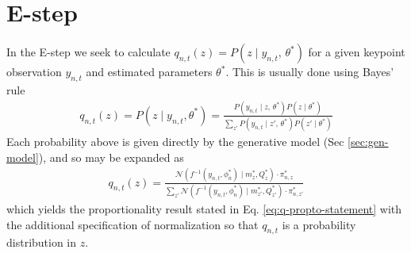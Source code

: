 \documentclass{article}         %
\newcommand{\NN}{\mathcal{N}}
\begin{document}
\section{E-step}

In the E-step we seek to calculate $q_{n, t}(z) = P(z\mid y_{n, t},\,\theta^*)$ for a given keypoint observation $y_{n, t}$ and estimated parameters $\theta^*$. This is usually done using Bayes' rule
\begin{align}
    q_{n,t}(z) = P(z\mid y_{n, t}, \theta^*) = \frac{P(y_{n, t}\mid z,\,\theta^*)P(z\mid \theta^*)}{\sum_{z'} P(y_{n, t}\mid z',\,\theta^*)P(z'\mid \theta^*)}
\end{align}
Each probability above is given directly by the generative model (Sec \ref{sec:gen-model}), and so may be expanded as
\begin{align}
    q_{n,t}(z) = \frac{ \NN(f^{-1}(y_{n,t}, \phi^*_n) \mid m_{z}^*, Q_{z}^*) \cdot \pi_{n,z}^* }{ \sum_{z'} \NN(f^{-1}(y_{n,t}, \phi^*_n) \mid m_{z'}^*, Q_{z'}^*) \cdot \pi_{n,z'}^* }
\end{align}
which yields the proportionality result stated in Eq. \ref{eq:q-propto-statement} with the additional specification of normalization so that $q_{n,t}$ is a probability distribution in $z$.
\end{document}
